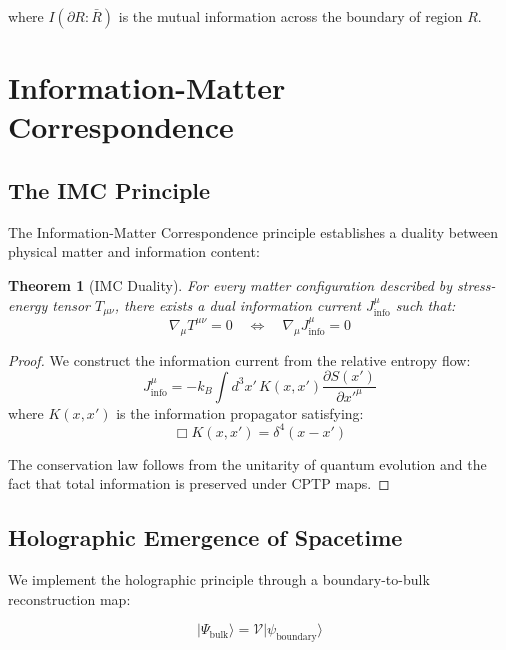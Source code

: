 \documentclass[12pt,a4paper]{article}
\newtheorem{theorem}{Theorem}[section]
\begin{document}
where $I(\partial R : \bar{R})$ is the mutual information across the boundary of region $R$.

\section{Information-Matter Correspondence}

\subsection{The IMC Principle}

The Information-Matter Correspondence principle establishes a duality between physical matter and information content:

\begin{theorem}[IMC Duality]
For every matter configuration described by stress-energy tensor $T_{\mu\nu}$, there exists a dual information current $J^\mu_{\text{info}}$ such that:
\begin{equation}
\nabla_\mu T^{\mu\nu} = 0 \quad \Leftrightarrow \quad \nabla_\mu J^\mu_{\text{info}} = 0
\end{equation}
\end{theorem}

\begin{proof}
We construct the information current from the relative entropy flow:
\begin{equation}
J^\mu_{\text{info}} = -k_B \int d^3x' \, K(x, x') \frac{\partial S(x')}{\partial x'^\mu}
\end{equation}
where $K(x, x')$ is the information propagator satisfying:
\begin{equation}
\Box K(x, x') = \delta^4(x - x')
\end{equation}

The conservation law follows from the unitarity of quantum evolution and the fact that total information is preserved under CPTP maps.
\end{proof}

\subsection{Holographic Emergence of Spacetime}

We implement the holographic principle through a boundary-to-bulk reconstruction map:

\begin{equation}
|\Psi_{\text{bulk}}\rangle = \mathcal{V} |\psi_{\text{boundary}}\rangle
\end{equation}
\end{document}
